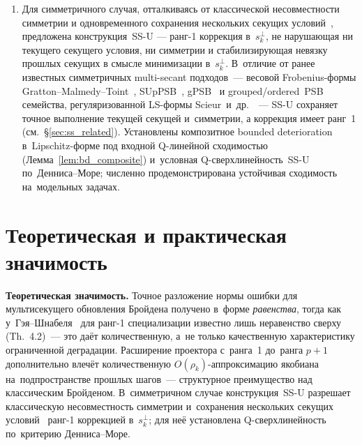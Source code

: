 \begin{enumerate}[leftmargin=*]
\begin{enumerate}[label=(\alph*),leftmargin=*]
                якобиана на $\operatorname{col}(S_p)$
                (см.~следствие~\ref{cor:subspace-alignment}).
        \end{enumerate}
  \item Для симметричного случая, отталкиваясь от классической
        несовместности симметрии и одновременного сохранения нескольких
        секущих условий~\cite{schnabel1983}, предложена конструкция~SS-U
        --- ранг-1 коррекция в~$s_k^{\perp}$, не нарушающая ни текущего
        секущего условия, ни симметрии и стабилизирующая невязку прошлых
        секущих в смысле минимизации в~$s_k^{\perp}$. В~отличие от
        ранее известных симметричных multi-secant подходов~--- весовой
        Frobenius-формы Gratton--Malmedy--Toint~\cite{gratton2015},
        SUpPSB~\cite{boutet2020}, gPSB~\cite{boutet2021} и
        grouped/ordered~PSB~\cite{boutet2022} семейства, регуляризованной
        LS-формы Scieur~и~др.~\cite{scieur2021}~--- SS-U сохраняет точное
        выполнение текущей секущей и~симметрии, а коррекция имеет ранг~1
        (см.\ \S\ref{sec:ss_related}). Установлены композитное bounded
        deterioration в~Lipschitz-форме под входной Q-линейной
        сходимостью (Лемма~\ref{lem:bd_composite}) и~условная
        Q-сверхлинейность~SS-U по~Денниса--Море; численно
        продемонстрирована устойчивая сходимость на~модельных задачах.
\end{enumerate}

\section*{Теоретическая и практическая значимость}

\textbf{Теоретическая значимость.} Точное разложение нормы ошибки для
мультисекущего обновления Бройдена получено в~форме \emph{равенства},
тогда как у~Гэя--Шнабеля~\cite{gay_schnabel1978} для ранг-1 специализации
известно лишь неравенство сверху (Th.~4.2)~--- это даёт количественную,
а~не только качественную характеристику ограниченной деградации.
Расширение проектора с~ранга~1 до~ранга $p{+}1$ дополнительно влечёт
количественную $O(\rho_k)$-аппроксимацию якобиана на~подпространстве
прошлых шагов~--- структурное преимущество над классическим Бройденом.
В~симметричном случае конструкция~SS-U разрешает классическую
несовместность симметрии и~сохранения нескольких секущих
условий~\cite{schnabel1983} ранг-1 коррекцией в~$s_k^\perp$; для неё
установлена Q-сверхлинейность по~критерию Денниса--Море.

